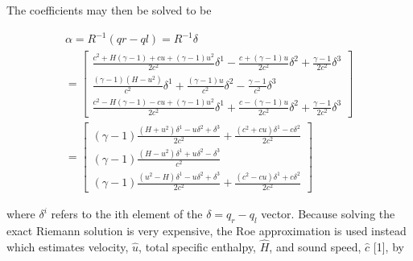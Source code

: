 \documentclass{article}%
\numberwithin{equation}{section}
\begin{document}
The coefficients may then be solved to be

\begin{equation}
\begin{split}
\alpha = R^{-1}(qr - ql)  = R^{-1} \delta \\
= \left[ \begin{array}{c} \frac{c^2 + H (\gamma-1) + c u + (\gamma-1) u^2}{2 c^2} \delta^1 -\frac{c + (\gamma - 1) u}{2 c^2} \delta^2 +   \frac{\gamma - 1}{2 c^2} \delta^3 \\ \frac{ (\gamma - 1) (H - u^2)}{c^2} \delta^1 +  \frac{(\gamma - 1) u}{c^2} \delta^2 -  \frac{\gamma - 1}{ c^2}  \delta^3 \\ \frac{c^2 - H (\gamma - 1) - c u + (\gamma - 1) u^2}{2 c^2} \delta^1 + \frac{c - (\gamma - 1) u}{2 c^2} \delta^2 +   \frac{\gamma - 1}{2 c^2} \delta^3 \end{array} \right] \\
= \left[ \begin{array}{c} (\gamma - 1) \frac{(H + u^2) \delta^1 - u \delta^2 + \delta^3}{2 c^2} + \frac{(c^2 + c u) \delta^1 - c \delta^2}{2 c^2} \\ (\gamma - 1) \frac{(H - u^2)\delta^1 + u \delta^2 - \delta^3}{ c^2} \\ (\gamma - 1) \frac{(u^2 - H) \delta^1 - u \delta^2 + \delta^3}{2 c^2} + \frac{(c^2 - c u) \delta^1 + c \delta^2}{2 c^2} \end{array} \right]
\end{split} \label{coeffcients}
\end{equation}

where $\delta^i$ refers to the ith element of the $\delta = q_r - q_l $ vector. Because solving the exact Riemann solution is very expensive, the Roe approximation is used instead which estimates velocity, $\hat{u}$, total specific enthalpy, $\hat{H}$, and sound speed, $\hat{c}$ [1], by
\end{document}
